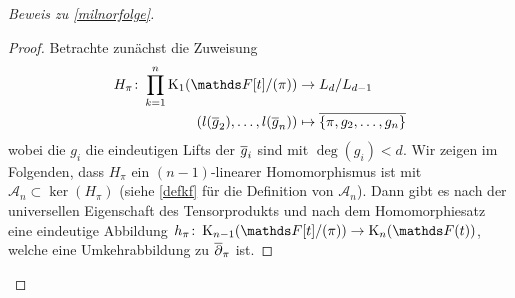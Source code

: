 \documentclass[ngerman,fontsize=11pt, paper=a4, parskip=half, titlepage=true, toc=bib]{scrartcl}
\begin{document}
\begin{proof}[Beweis zu \ref{milnorfolge}]
\begin{proof}
    Betrachte zunächst die Zuweisung
    \begin{align*}
      H_\pi\colon\prod_{k=1}^n \K_1(\Ftpi) 
      &\to L_d/L_{d-1}\\
      \left( l(\ov g_2),\dotsc, l(\ov g_n) \right)
      &\mapsto \ov{\{\pi,g_2,\dotsc,g_n\}}
    \end{align*}
    wobei die $g_i$ die eindeutigen Lifts der $\overline g_i$ sind mit $\deg(g_i)<d$.
    Wir zeigen im Folgenden, dass $H_\pi$ ein $(n-1)$-linearer
    Homomorphismus ist mit $\mathcal{A}_n\subset \ker(H_\pi)$ (siehe
    \ref{defkf} für die Definition von $\mathcal{A}_n$).
    Dann gibt es nach der universellen Eigenschaft des Tensorprodukts
    und nach dem Homomorphiesatz eine eindeutige Abbildung 
    $h_\pi\colon\K_{n-1}(\Ftpi)\to\KnFt$,
    welche 
    eine Umkehrabbildung
    zu $\overline\partial_\pi$ ist.
    


\end{proof}
\end{proof}
\end{document}
